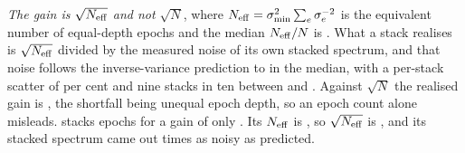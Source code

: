 \emph{The gain is $\sqrt{N_{\rm eff}}$ and not $\sqrt{N}$}, where
$N_{\rm eff}=\sigma_{\min}^{2}\sum_e\sigma_e^{-2}$ is the equivalent number of
equal-depth epochs and the median $N_{\rm eff}/N$ is \StkNeffFrac. What a
stack realises is $\sqrt{N_{\rm eff}}$ divided by the measured noise of its
own stacked spectrum, and that noise follows the inverse-variance prediction
to \StkGainVsNeff{} in the median, with a per-stack scatter of
\StkMadZScatterPct{} per cent and nine stacks in ten between \SzNoiseLo{} and
\SzNoiseHi. Against $\sqrt{N}$ the realised gain is \StkGainVsN, the
shortfall being unequal epoch depth, so an epoch count alone misleads.
\StkWorstStar{} stacks \StkWorstN{} epochs for a gain of only
\StkWorstGain. Its $N_{\rm eff}$ is \StkWorstNeff, so
$\sqrt{N_{\rm eff}}$ is \SzWorstSqrtNeff, and its stacked spectrum came out
\SzWorstNoise{} times as noisy as predicted.

